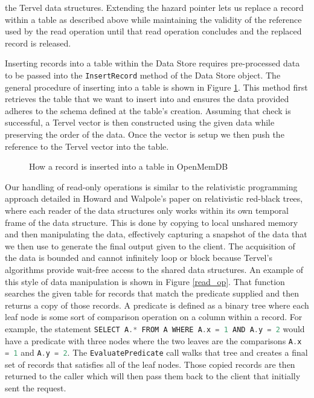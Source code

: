 \documentclass[letter,11pt]{article}
\let\oldReturn\Return
\renewcommand{\Return}{\State\oldReturn}
\newcommand{\inlinecode}[1]{\colorbox{codegrey}{\lstinline[language=C++]{#1}}}
\begin{document}
the Tervel data structures. Extending the hazard pointer lets us replace a record within a table as described 
above while maintaining the validity of the reference used by the read operation until that read operation
concludes and the replaced record is released.
\par\vspace{\baselineskip}
Inserting records into a table within the Data Store requires pre-processed data to be passed
into the \inlinecode{InsertRecord} method of the Data Store object. The general procedure of inserting
into a table is shown in Figure \ref{insert_record}. This method first retrieves the table 
that we want to insert into and ensures the data provided adheres to the schema defined 
at the table's creation. Assuming that check is successful, a Tervel vector is then 
constructed using the given data while preserving the order of the data. Once the vector 
is setup we then push the reference to the Tervel vector into the table.

\begin{figure}
 \begin{algorithmic}
 \EndIf
  \State{}
 \EndFor
 \State{}
 \EndFunction
 \end{algorithmic}
 \caption{How a record is inserted into a table in OpenMemDB}
 \label{insert_record}
\end{figure}

\par\vspace{\baselineskip}
Our handling of read-only operations is similar to the relativistic programming approach detailed 
in Howard and Walpole's paper on relativistic red-black trees, where each reader of the 
data structures only works within its own temporal frame of the data structure\cite{rbtree}. 
This is done by copying to local unshared memory and then manipulating the data, 
effectively capturing a snapshot of the data that we then use to generate the final 
output given to the client. The acquisition of the data is bounded and cannot 
infinitely loop or block because Tervel's algorithms provide wait-free access 
to the shared data structures. An example of this style of data manipulation is shown in 
Figure \ref{read_op}. That function searches the given table for records that match
the predicate supplied and then returns a copy of those records. A predicate is defined
as a binary tree where each leaf node is some sort of comparison operation on a column
within a record. For example, the statement \inlinecode{SELECT A.* FROM A WHERE A.x = 1 AND A.y = 2}
would have a predicate with three nodes where the two leaves are the comparisons
\inlinecode{A.x = 1} and \inlinecode{A.y = 2}. The \inlinecode{EvaluatePredicate} call
walks that tree and creates a final set of records that satisfies all of the
leaf nodes. Those copied records are then returned to the caller which will then
pass them back to the client that initially sent the request.
\end{document}
